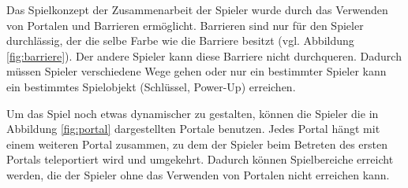 Das Spielkonzept der Zusammenarbeit der Spieler wurde durch das Verwenden von Portalen und Barrieren ermöglicht. Barrieren sind nur für den Spieler durchlässig, der die selbe Farbe wie die Barriere besitzt (vgl. Abbildung \ref{fig:barriere}). Der andere Spieler kann diese Barriere nicht durchqueren. Dadurch müssen Spieler verschiedene Wege gehen oder nur ein bestimmter Spieler kann ein bestimmtes Spielobjekt (Schlüssel, Power-Up) erreichen.

Um das Spiel noch etwas dynamischer zu gestalten, können die Spieler die in Abbildung \ref{fig:portal} dargestellten Portale benutzen. Jedes Portal hängt mit einem weiteren Portal zusammen, zu dem der Spieler beim Betreten des ersten Portals teleportiert wird und umgekehrt. Dadurch können Spielbereiche erreicht werden, die der Spieler ohne das Verwenden von Portalen nicht erreichen kann.

